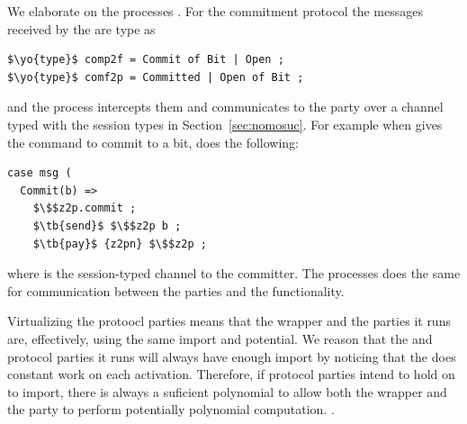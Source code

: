 We elaborate on the processes . For the commitment protocol the messages received by the \partywrapper are type as 
\begin{lstlisting}[basicstyle=\footnotesize\BeraMonottFamily, mathescape]
$\yo{type}$ comp2f = Commit of Bit | Open ;
$\yo{type}$ comf2p = Committed | Open of Bit ;
\end{lstlisting}
and the  process intercepts them and communicates to the party over a channel typed with the \Fcom session types in Section~\ref{sec:nomosuc}.
For example when \Z gives the command to commit to a bit,  does the following:
\begin{lstlisting}[basicstyle=\footnotesize\BeraMonottFamily, frame=single, mathescape]
case msg (
  Commit(b) =>
    $\$$z2p.commit ;
    $\tb{send}$ $\$$z2p b ;
    $\tb{pay}$ {z2pn} $\$$z2p ;
\end{lstlisting}
where  is the session-typed channel to the committer.
The  processes does the same for communication between the parties and the functionality.

Virtualizing the protoocl parties means that the wrapper and the parties it runs are, effectively, using the same import and potential.
We reason that the \partywrapper and protocol parties it runs will always have enough import by noticing that the \partywrapper does constant work on each activation.
Therefore, if protocol parties intend to hold on to import, there is always a suficient polynomial to allow both the wrapper and the party to perform potentially polynomial computation.
.


